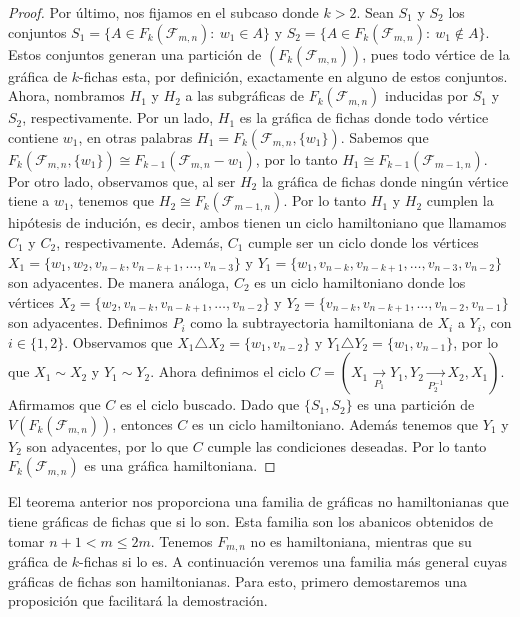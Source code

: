\begin{proof}
    Por \'ultimo, nos fijamos en el subcaso donde $k>2$. Sean $S_1$ y $S_2$ los
    conjuntos $S_1=\{A \in F_k(\mathcal{F}_{m,n}) \colon\ w_1 \in A\}$ y
    $S_2=\{A \in F_k(\mathcal{F}_{m,n}) \colon\ w_1 \notin A\}$. Estos conjuntos
    generan una partici\'on de $(F_k(\mathcal{F}_{m,n}))$, pues todo v\'ertice
    de la gr\'afica de $k$-fichas esta, por definici\'on, exactamente en alguno
    de estos conjuntos. Ahora, nombramos $H_1$ y $H_2$ a las subgr\'aficas de
    $F_k(\mathcal{F}_{m,n})$ inducidas por $S_1$ y $S_2$, respectivamente. Por
    un lado, $H_1$ es la gr\'afica de fichas donde todo v\'ertice contiene
    $w_1$, en otras palabras $H_1= F_k(\mathcal{F}_{m,n},\{w_1\})$. Sabemos que
    $F_k(\mathcal{F}_{m,n},\{w_1\}) \cong F_{k-1}(\mathcal{F}_{m,n}- w_1)$, por
    lo tanto $H_1 \cong F_{k-1}(\mathcal{F}_{m-1,n})$. Por otro lado, observamos
    que, al ser $H_2$ la gr\'afica de fichas donde ning\'un v\'ertice tiene a
    $w_1$, tenemos que $H_2 \cong F_k(\mathcal{F}_{m-1,n})$. Por lo tanto $H_1$
    y $H_2$ cumplen la hip\'otesis de induci\'on, es decir, ambos tienen un
    ciclo hamiltoniano que llamamos $C_1$ y $C_2$, respectivamente. Adem\'as,
    $C_1$ cumple ser un ciclo donde los v\'ertices $X_1 = \{w_1,
    w_2,v_{n-k},v_{n-k+1}, \dots, v_{n-3}\}$ y $Y_1 = \{w_1,v_{n-k},v_{n-k+1},
    \dots, v_{n-3},v_{n-2}\}$ son adyacentes. De manera an\'aloga, $C_2$ es un
    ciclo hamiltoniano donde los v\'ertices $X_2 = \{ w_2,v_{n-k},v_{n-k+1},
    \dots, v_{n-2}\}$ y $Y_2 = \{v_{n-k},v_{n-k+1}, \dots, v_{n-2},v_{n-1}\}$
    son adyacentes. Definimos $P_i$ como la subtrayectoria hamiltoniana de $X_i$
    a $Y_i$, con $i \in \{ 1,2 \}$. Observamos que $X_1 \triangle X_2 =
    \{w_1,v_{n-2}\}$ y $Y_1 \triangle Y_2 = \{w_1, v_{n-1}\}$, por lo que $X_1
    \sim X_2$ y $Y_1 \sim Y_2$. Ahora definimos el ciclo $C = (X_1
    \xrightarrow[P_1]{}Y_1,Y_2 \xrightarrow[P_2^{-1}]{}X_2,X_1)$. Afirmamos que
    $C$ es el ciclo buscado. Dado que $\{S_1,S_2\}$ es una partici\'on de
    $V(F_k(\mathcal{F}_{m,n}))$, entonces $C$ es un ciclo hamiltoniano. Adem\'as
    tenemos que $Y_1$ y $Y_2$ son adyacentes, por lo que $C$ cumple las
    condiciones deseadas. Por lo tanto $F_k(\mathcal{F}_{m,n})$ es una gr\'afica
    hamiltoniana.
\end{proof}

El teorema anterior nos proporciona una familia de gr\'aficas no hamiltonianas
que tiene gr\'aficas de fichas que si lo son. Esta familia son los abanicos
obtenidos de tomar $n+1 < m \leq 2m$. Tenemos $F_{m,n}$ no es hamiltoniana,
mientras que su gr\'afica de $k$-fichas si lo es. A continuaci\'on veremos una
familia m\'as general cuyas gr\'aficas de fichas son hamiltonianas. Para esto,
primero demostaremos una proposici\'on que facilitar\'a la demostraci\'on.

